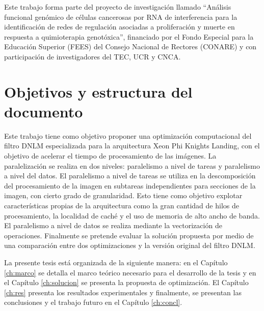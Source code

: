 Este trabajo forma parte del proyecto de investigaci\'on llamado ``Análisis funcional genómico de células cancerosas por RNA de interferencia para la identificación de redes de regulación asociadas a proliferación y muerte en respuesta a quimioterapia genotóxica'', financiado por el Fondo Especial para la Educaci\'on Superior (FEES) del Consejo Nacional de Rectores (CONARE) y con participaci\'on de investigadores del TEC, UCR y CNCA. 


\section{Objetivos y estructura del documento}


Este trabajo tiene como objetivo proponer una optimizaci\'on computacional del filtro DNLM especializada para la arquitectura Xeon Phi Knights Landing, con el objetivo de acelerar el tiempo de procesamiento de las im\'agenes. La paralelizaci\'on se realiza en dos niveles: paralelismo a nivel de tareas y paralelismo a nivel del datos. El paralelismo a nivel de tareas se utiliza en la descomposici\'on del procesamiento de la imagen en subtareas independientes para secciones de la imagen, con cierto grado de granularidad. Esto tiene como objetivo explotar caracter\'isticas propias de la arquitectura como la gran cantidad de hilos de procesamiento, la localidad de cach\'e y el uso de memoria de alto ancho de banda. El paralelismo a nivel de datos se realiza mediante la vectorizaci\'on de operaciones. Finalmente se pretende evaluar la soluci\'on propuesta por medio de una comparaci\'on entre dos optimizaciones y la versi\'on original del filtro DNLM.


La presente tesis est\'a organizada de la siguiente manera: en el Cap\'itulo \ref{ch:marco} se detalla el marco te\'orico necesario para el desarrollo de la tesis y en el Cap\'itulo \ref{ch:solucion} se presenta la propuesta de optimizaci\'on. El Cap\'itulo \ref{ch:res} presenta los resultados experimentales y finalmente, se presentan las conclusiones y el trabajo futuro en el Cap\'itulo \ref{ch:concl}. 
